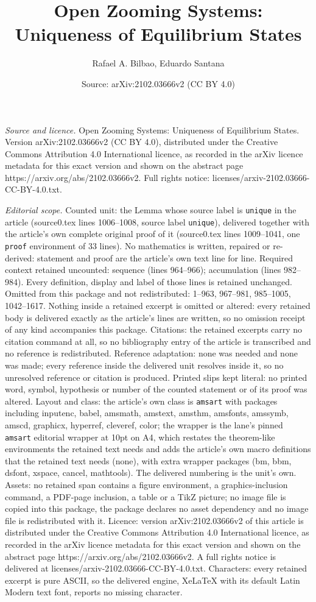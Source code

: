 \documentclass[10pt,a4paper]{amsart}
\title[Open Zooming Systems: Uniqueness of Equilibrium States]{Open Zooming Systems: Uniqueness of Equilibrium States}
\author{Rafael A. Bilbao, Eduardo Santana}
\date{Source: arXiv:2102.03666v2 (CC BY 4.0)}
\begin{document}
\maketitle

\noindent\emph{Source and licence.} Open Zooming Systems: Uniqueness of Equilibrium States. Version arXiv:2102.03666v2 (CC BY 4.0), distributed under the Creative Commons Attribution 4.0 International licence, as recorded in the arXiv licence metadata for this exact version and shown on the abstract page https://arxiv.org/abs/2102.03666v2. Full rights notice: licenses/arxiv-2102.03666-CC-BY-4.0.txt.\par\smallskip

\noindent\textit{Editorial scope.} Counted unit: the Lemma whose source label is \texttt{unique} in the article (source0.tex lines 1006--1008, source label \texttt{unique}), delivered together with the article's own complete original proof of it (source0.tex lines 1009--1041, one \texttt{proof} environment of 33 lines). No mathematics is written, repaired or re-derived: statement and proof are the article's own text line for line. Required context retained uncounted: sequence (lines 964--966); accumulation (lines 982--984). Every definition, display and label of those lines is retained unchanged. Omitted from this package and not redistributed: 1--963, 967--981, 985--1005, 1042--1617. Nothing inside a retained excerpt is omitted or altered: every retained body is delivered exactly as the article's lines are written, so no omission receipt of any kind accompanies this package. Citations: the retained excerpts carry no citation command at all, so no bibliography entry of the article is transcribed and no reference is redistributed. Reference adaptation: none was needed and none was made; every reference inside the delivered unit resolves inside it, so no unresolved reference or citation is produced. Printed slips kept literal: no printed word, symbol, hypothesis or number of the counted statement or of its proof was altered. Layout and class: the article's own class is \texttt{amsart} with packages including inputenc, babel, amsmath, amstext, amsthm, amsfonts, amssymb, amscd, graphicx, hyperref, cleveref, color; the wrapper is the lane's pinned \texttt{amsart} editorial wrapper at 10pt on A4, which restates the theorem-like environments the retained text needs and adds the article's own macro definitions that the retained text needs (none), with extra wrapper packages (bm, bbm, dsfont, xspace, cancel, mathtools). The delivered numbering is the unit's own. Assets: no retained span contains a figure environment, a graphics-inclusion command, a PDF-page inclusion, a table or a TikZ picture; no image file is copied into this package, the package declares no asset dependency and no image file is redistributed with it. Licence: version arXiv:2102.03666v2 of this article is distributed under the Creative Commons Attribution 4.0 International licence, as recorded in the arXiv licence metadata for this exact version and shown on the abstract page https://arxiv.org/abs/2102.03666v2. A full rights notice is delivered at licenses/arxiv-2102.03666-CC-BY-4.0.txt. Characters: every retained excerpt is pure ASCII, so the delivered engine, XeLaTeX with its default Latin Modern text font, reports no missing character.
\end{document}
